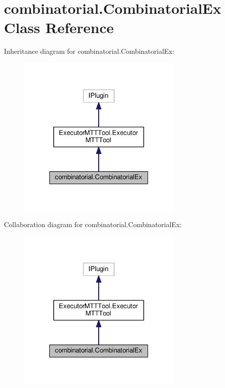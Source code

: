\hypertarget{classcombinatorial_1_1CombinatorialEx}{\section{combinatorial.\-Combinatorial\-Ex Class Reference}
\label{classcombinatorial_1_1CombinatorialEx}
}


Inheritance diagram for combinatorial.\-Combinatorial\-Ex\-:
\nopagebreak
\begin{figure}[H]
\begin{center}
\leavevmode
\includegraphics[width=228pt]{classcombinatorial_1_1CombinatorialEx__inherit__graph}
\end{center}
\end{figure}


Collaboration diagram for combinatorial.\-Combinatorial\-Ex\-:
\nopagebreak
\begin{figure}[H]
\begin{center}
\leavevmode
\includegraphics[width=228pt]{classcombinatorial_1_1CombinatorialEx__coll__graph}
\end{center}
\end{figure}
